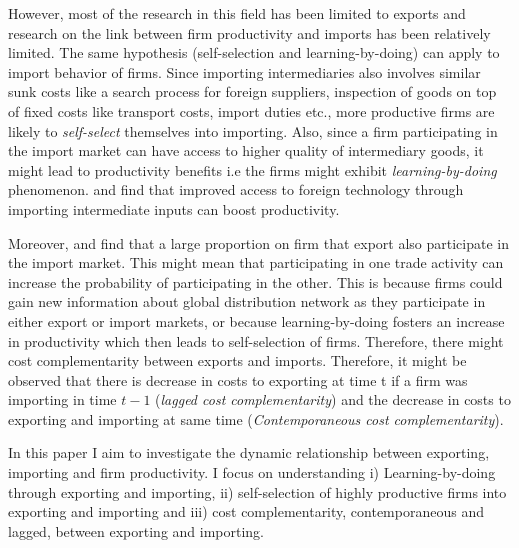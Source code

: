 \documentclass[12pt]{article}
\begin{document}



However, most of the research in this field has been limited to
exports and research on the link between firm productivity and imports has been relatively limited. The same hypothesis (self-selection and learning-by-doing) can  apply
to import behavior of firms. Since importing intermediaries also
involves  
similar sunk costs like  a search process for foreign suppliers,
inspection of goods on top of fixed costs like  transport costs, import duties
etc., more productive firms are likely to \textit{self-select} themselves
into importing. Also, since a firm
participating in the import market can have access to higher quality
of intermediary goods, it might lead to productivity benefits
i.e the firms might exhibit \textit{learning-by-doing} phenomenon. 
\textcite{topalova2011trade}  and \textcite{halpern2011imported}
find that improved access to foreign technology through importing
intermediate inputs can boost productivity. 

Moreover, \textcite{muuls2009imports} and \textcite{aristei2013firms} find that
a large proportion on firm that export also participate in the import
market. This might mean that participating in one trade activity can increase the probability of
participating in the other. This is
because  firms could gain new information about global distribution
network as they participate in either export or import markets, or
because learning-by-doing fosters an increase in productivity which
then leads to self-selection of firms. Therefore, there might cost
complementarity between exports and imports. Therefore, it might be
observed that there is decrease in costs to
exporting at time t if a firm was importing in time $t-1$
(\textit{lagged cost complementarity}) and the decrease in costs 
to exporting and importing at same time 
(\textit{Contemporaneous cost complementarity}).  

In this paper I aim to investigate the dynamic relationship between
exporting, importing and firm productivity. I focus on understanding 
i) Learning-by-doing through exporting and importing, ii)
self-selection of highly productive firms into exporting and importing
and iii) cost
complementarity, contemporaneous and lagged, between exporting and
importing. 
\end{document}
